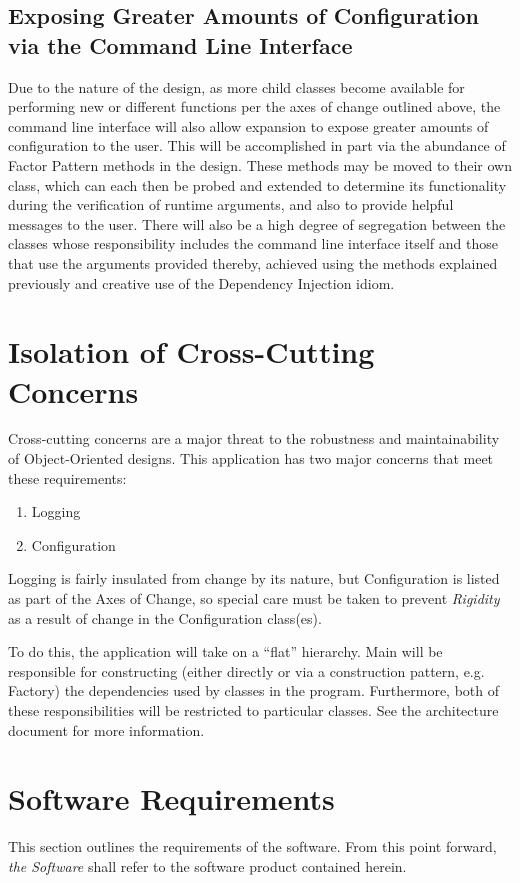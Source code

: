 \documentclass{designdoc}
\begin{document}
\subsection{Exposing Greater Amounts of Configuration via the Command Line
  Interface}
Due to the nature of the design, as more child classes become available for
performing new or different functions per the axes of change outlined above,
the command line interface will also allow expansion to expose greater amounts
of configuration to the user. This will be accomplished in part via the
abundance of Factor Pattern methods in the design. These methods may be moved
to their own class, which can each then be probed and extended to determine its
functionality during the verification of runtime arguments, and also to provide
helpful messages to the user. There will also be a high degree of segregation
between the classes whose responsibility includes the command line interface
itself and those that use the arguments provided thereby, achieved using the
methods explained previously and creative use of the Dependency Injection
idiom.

\section{Isolation of Cross-Cutting Concerns}
Cross-cutting concerns are a major threat to the robustness and maintainability
of Object-Oriented designs. This application has two major concerns that meet
these requirements:
\begin{enumerate}
\item Logging
\item Configuration
\end{enumerate}
Logging is fairly insulated from change by its nature, but Configuration is
listed as part of the Axes of Change, so special care must be taken to prevent
\textit{Rigidity} as a result of change in the Configuration class(es).

To do this, the application will take on a ``flat'' hierarchy. Main will be
responsible for constructing (either directly or via a construction pattern,
e.g. Factory) the dependencies used by classes in the program. Furthermore,
both of these responsibilities will be restricted to particular classes. See
the architecture document for more information.

\section{Software Requirements}
This section outlines the requirements of the software. From this point
forward, \emph{the Software} shall refer to the software product contained
herein.
\end{document}
